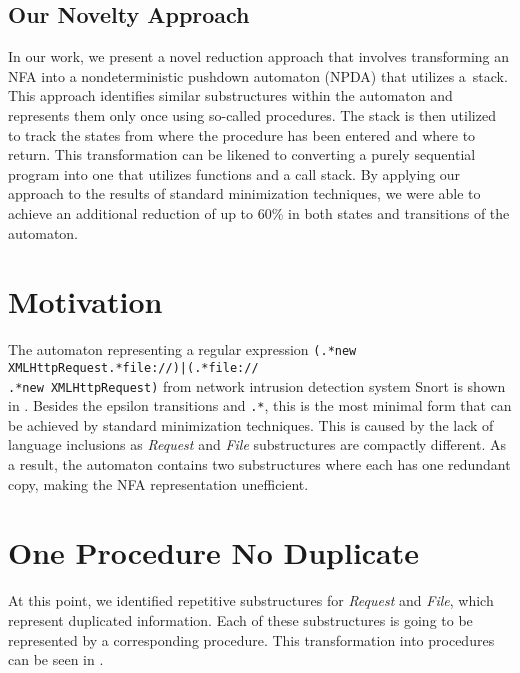 \documentclass{ExcelAtFIT}
\begin{document}
	\subsection*{Our Novelty Approach}
		In our work, we present a novel reduction approach that involves transforming an NFA into a nondeterministic pushdown automaton (NPDA) that utilizes a~stack. This approach identifies similar substructures within the automaton and represents them only once using so-called procedures. The stack is then utilized to track the states from where the procedure has been entered and where to return. This transformation can be likened to converting a purely sequential program into one that utilizes functions and a call stack. By applying our approach to the results of standard minimization techniques, we were able to achieve an additional reduction of up to 60\% in both states and transitions of the automaton.

\section{Motivation}
	The automaton representing a regular expression \texttt{(.*new XMLHttpRequest.*file://)|(.*file://\\.*new XMLHttpRequest)} from network intrusion detection system Snort \cite{Snort} is shown in . Besides the epsilon transitions and \texttt{.*}, this is the most minimal form that can be achieved by standard minimization techniques. This is caused by the lack of language inclusions as  \textit{Request} and \textit{File} substructures are compactly different. As a result, the automaton contains two substructures where each has one redundant copy, making the NFA representation unefficient.

\section{One Procedure No Duplicate}
	At this point, we identified repetitive substructures for \textit{Request} and \textit{File}, which represent duplicated information. Each of these substructures is going to be represented by a corresponding procedure. This transformation into procedures can be seen in .
\end{document}
